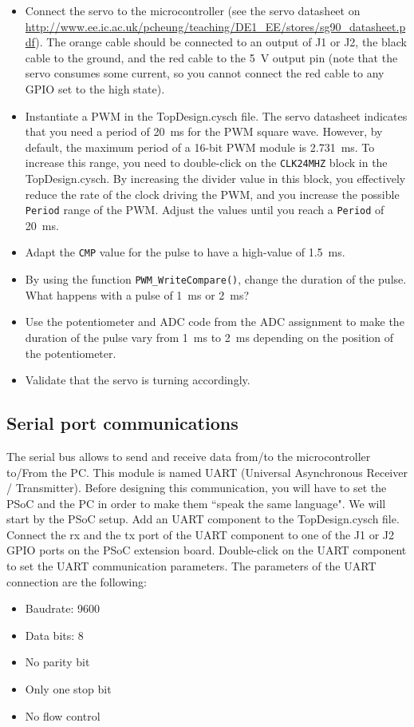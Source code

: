 \begin{itemize}
	\item Connect the servo to the microcontroller (see the servo datasheet on \url{http://www.ee.ic.ac.uk/pcheung/teaching/DE1_EE/stores/sg90_datasheet.pdf}). The orange cable should be connected to an output of J1 or J2, the black cable to the ground, and the red cable to the 5~V output pin (note that the servo consumes some current, so you cannot connect the red cable to any GPIO set to the high state). 
	\item Instantiate a PWM in the TopDesign.cysch file. The servo datasheet indicates that you need a period of 20~ms for the PWM square wave. However, by default, the maximum period of a 16-bit PWM module is 2.731~ms. To increase this range, you need to double-click on the \texttt{CLK24MHZ} block in the TopDesign.cysch. By increasing the divider value in this block, you effectively reduce the rate of the clock driving the PWM, and you increase the possible \texttt{Period} range of the PWM. Adjust the values until you reach a \texttt{Period} of 20~ms. 
	\item Adapt the \texttt{CMP} value for the pulse to have a high-value of 1.5~ms. 
	\item By using the function \texttt{PWM\_WriteCompare()}, change the duration of the pulse. What happens with a pulse of 1~ms or 2~ms? 
	\item Use the potentiometer and ADC code from the ADC assignment to make the duration of the pulse vary from 1~ms to 2~ms depending on the position of the potentiometer. 
	\item Validate that the servo is turning accordingly.
\end{itemize}







\newpage
\subsection{Serial port communications}

The serial bus allows to send and receive data from/to the microcontroller to/From the PC. This module is named UART (Universal Asynchronous Receiver / Transmitter). Before designing this communication, you will have to set the PSoC and the PC in order to make them ``speak the same language". We will start by the PSoC setup. Add an UART component to the TopDesign.cysch file. Connect the rx and the tx port of the UART component to one of the J1 or J2 GPIO ports on the PSoC extension board. Double-click on the UART component to set the UART communication parameters. The parameters of the UART connection are the following: 
\begin{itemize}
	\item Baudrate: 9600
	\item Data bits: 8
	\item No parity bit
	\item Only one stop bit
	\item No flow control
\end{itemize}

